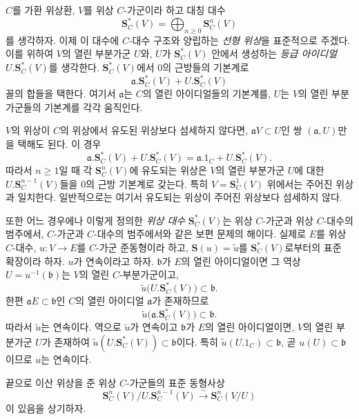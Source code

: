 \begin{env}[19.5.1]
\label{0.19.5.1-fr}
$C$를 가환 위상환, $V$를 위상 $C$-가군이라 하고 대칭 대수
\[
  \mathbf S_C^*(V)=\bigoplus_{n\geq0}\mathbf S_C^n(V)
\]
를 생각하자. 이제 이 대수에 $C$-대수 구조와 양립하는
\emph{선형 위상}을 표준적으로 주겠다. 이를 위하여 $V$의 열린
부분가군 $U$와, $U$가 $\mathbf S_C^*(V)$ 안에서 생성하는
\emph{등급 아이디얼} $U.\mathbf S_C^*(V)$를 생각한다.
$\mathbf S_C^*(V)$에서 $0$의 근방들의 기본계로
\[
  \mathfrak a.\mathbf S_C^*(V)+U.\mathbf S_C^*(V)
\]
꼴의 합들을 택한다. 여기서 $\mathfrak a$는 $C$의 열린
아이디얼들의 기본계를, $U$는 $V$의 열린 부분가군들의 기본계를
각각 움직인다.

$V$의 위상이 $C$의 위상에서 유도된 위상보다 섬세하지 않다면,
$\mathfrak aV\subset U$인 쌍 $(\mathfrak a,U)$만을 택해도 된다.
이 경우
\[
  \mathfrak a.\mathbf S_C^*(V)+U.\mathbf S_C^*(V)
  =\mathfrak a.1_C+U.\mathbf S_C^*(V).
\]
따라서 $n\geq1$일 때 각 $\mathbf S_C^n(V)$에 유도되는 위상은
$V$의 열린 부분가군 $U$에 대한
$U.\mathbf S_C^{n-1}(V)$들을 $0$의 근방 기본계로 갖는다. 특히
$V=\mathbf S_C^1(V)$ 위에서는 주어진 위상과 일치한다. 일반적으로는
여기서 유도되는 위상이 주어진 위상보다 섬세하지 않다.

또한 어느 경우에나 이렇게 정의한 \emph{위상 대수}
$\mathbf S_C^*(V)$는 위상 $C$-가군과 위상 $C$-대수의 범주에서,
$C$-가군과 $C$-대수의 범주에서와 같은 보편 문제의 해이다. 실제로
$E$를 위상 $C$-대수, $u:V\to E$를 $C$-가군 준동형이라 하고,
$\mathbf S(u)=\widetilde u$를 $\mathbf S_C^*(V)$로부터의 표준
확장이라 하자. $u$가 연속이라고 하자. $\mathfrak b$가 $E$의 열린
아이디얼이면 그 역상 $U=u^{-1}(\mathfrak b)$는 $V$의 열린
$C$-부분가군이고,
\[
  \widetilde u\bigl(U.\mathbf S_C^*(V)\bigr)
  \subset\mathfrak b.
\]
한편 $\mathfrak aE\subset\mathfrak b$인 $C$의 열린 아이디얼
$\mathfrak a$가 존재하므로
\[
  \widetilde u\bigl(\mathfrak a.\mathbf S_C^*(V)\bigr)
  \subset\mathfrak b.
\]
따라서 $\widetilde u$는 연속이다. 역으로 $\widetilde u$가
연속이고 $\mathfrak b$가 $E$의 열린 아이디얼이면, $V$의 열린
부분가군 $U$가 존재하여
$\widetilde u(U.\mathbf S_C^*(V))\subset\mathfrak b$이다. 특히
$\widetilde u(U.1_C)\subset\mathfrak b$, 곧
$u(U)\subset\mathfrak b$이므로 $u$는 연속이다.

끝으로 이산 위상을 준 위상 $C$-가군들의 표준 동형사상
\begin{equation}
\label{0.19.5.1.1-fr}
  \mathbf S_C^n(V)/U.\mathbf S_C^{n-1}(V)
  \xrightarrow{\sim}\mathbf S_C^n(V/U)
  \tag{19.5.1.1}
\end{equation}
이 있음을 상기하자.
\end{env}

